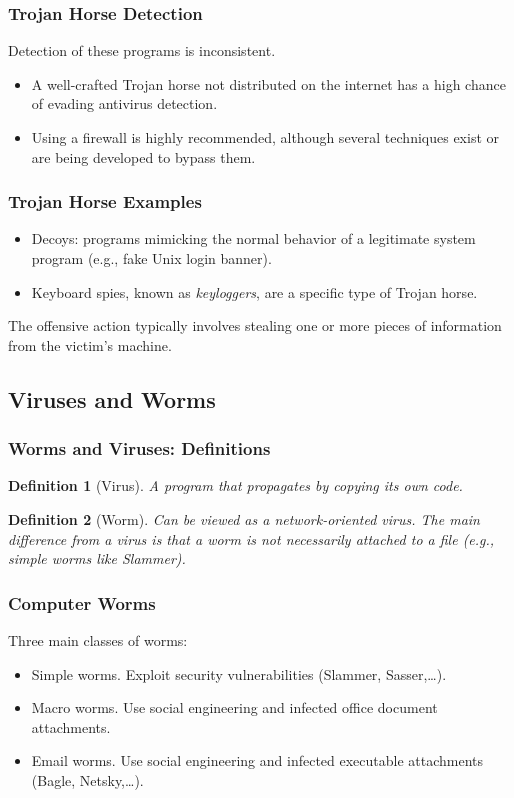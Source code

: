 \documentclass{beamer}
\newtheorem{deft}{Definition}
\newcommand{\enlight}[1]{\textit{\color{blue}#1}}
\begin{document}
\begin{frame}
\frametitle{Trojan Horse Detection}

Detection of these programs is inconsistent.
\begin{itemize}
\item A well-crafted Trojan horse not distributed on the internet has a high chance of evading antivirus detection.
  \bigskip
\item Using a firewall is highly recommended, although several techniques exist or are being developed to bypass them.
\end{itemize}
\end{frame}

\begin{frame}
\frametitle{Trojan Horse Examples}
\begin{itemize}
\item Decoys: programs mimicking the normal behavior of a legitimate system program (e.g., fake Unix login banner).
  \bigskip
\item Keyboard spies, known as \enlight{keyloggers}, are a specific type of Trojan horse.
\end{itemize}
\bigskip
The offensive action typically involves stealing one or more pieces of information from the victim's machine.
\end{frame}





\subsection{Viruses and Worms}
\begin{frame}
\frametitle{Worms and Viruses: Definitions}
\begin{deft}[Virus] A program that propagates by copying its own code.
\end{deft}

\begin{deft}[Worm] Can be viewed as a network-oriented virus. The main difference from a virus is that a worm is not necessarily attached to a file (e.g., simple worms like Slammer).
\end{deft}
\end{frame}

\begin{frame}
\frametitle{Computer Worms}

Three main classes of worms:
\begin{itemize}
\item {\color{lightblue} Simple worms.} Exploit security vulnerabilities (Slammer, Sasser,\ldots).
\item {\color{lightblue} Macro worms.} Use social engineering and infected office document attachments.
\item {\color{lightblue} Email worms.} Use social engineering and infected executable attachments (Bagle, Netsky,\ldots).
\end{itemize}

\end{frame}
\end{document}

